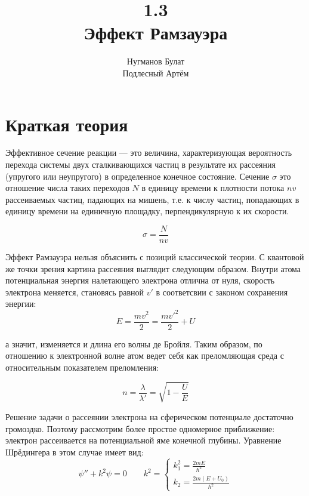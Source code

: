 \documentclass[a4paper, 12pt]{article}%
\author{Нугманов Булат \\ Подлесный Артём}
\title{1.3 \\ Эффект Рамзауэра}
\begin{document}
	\maketitle
	
	\section*{Краткая теория}
	Эффективное сечение реакции --- это величина, характеризующая вероятность перехода системы двух сталкивающихся частиц в результате их рассеяния (упругого или неупругого) в определенное конечное состояние. Сечение $\sigma$ это отношение числа таких переходов $N$ в единицу времени к плотности потока $nv$ рассеиваемых частиц, падающих на мишень, т.е. к числу частиц, попадающих в единицу времени на единичную площадку, перпендикулярную к их скорости.
	
	\begin{equation}
		\sigma = \frac{N}{nv}
	\end{equation}
	
	Эффект Рамзауэра нельзя объяснить с позиций классической теории. С квантовой же точки зрения картина рассеяния выглядит следующим образом. Внутри атома потенциальная энергия налетающего электрона отлична от нуля, скорость электрона меняется, становясь равной $v'$ в соответсвии с законом сохранения энергии:
	\begin{equation}
		E = \frac{mv^2}{2} = \frac{mv'^2}{2} + U
	\end{equation}
	
	а значит, изменяется и длина его волны де Бройля. Таким образом, по отношению к электронной волне атом ведет себя как преломляющая среда с относительным показателем преломления:
	
	\begin{equation}
		n = \frac{\lambda}{\lambda'} = \sqrt{1 - \frac{U}{E}}
	\end{equation}
	
	Решение задачи о рассеянии электрона на сферическом потенциале достаточно громоздко. Поэтому рассмотрим более простое одномерное приближение: электрон рассеивается на потенциальной яме конечной глубины. Уравнение Шрёдингера в этом случае имеет вид:
	\begin{equation}
		\psi'' + k^2\psi = 0 \qquad k^2 = \begin{cases}
			k_1^2  = \frac{2mE}{\hbar^2} \\
			k_2 = \frac{2m(E+U_0)}{\hbar^2}
		\end{cases}
	\end{equation}
	
\end{document}
